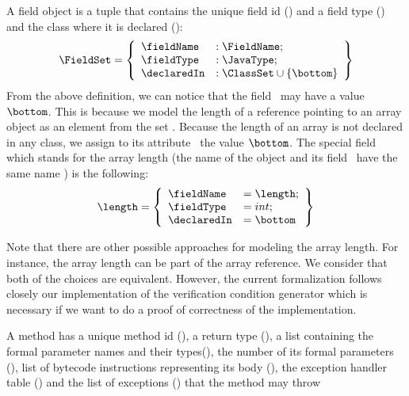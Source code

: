  A field object is a tuple that contains the unique field id (\fieldName) and a field type (\fieldType) and
 the class where it is declared (\declaredIn):  
 $$ \begin{array}{l}
         \FieldSet = \left\{\begin{array}{ll}   
		                               \fieldName  &  : \FieldName;\\
                                               \fieldType   &  : \JavaType; \\
					       \declaredIn  &  : \ClassSet \cup \{ \bottom \}
                     \end{array} \right\}
   \end{array} $$
  From the above definition, we can notice that the field \declaredIn \ may have a value $\bottom$. This is because we model 
  the length of a reference pointing to an array object as an element from the set \FieldSet. Because the length of 
  an array is not declared in any class, 
  we assign to its attribute \declaredIn \ the value $\bottom$.  
  The special field which stands for the array length  
 (the name of the object and its field  \fieldName \ have the same name ) is the following:
 $$  \length =  \left\{\begin{array}{ll} \fieldName & = \length;\\
			                 \fieldType  & = int; \\
					 \declaredIn & = \bottom
                     \end{array} \right\}$$

 Note that there are other possible approaches for modeling the array length. For instance,
 the array length can be part of the array reference. We consider that both of the choices are equivalent.
 However, the current formalization follows closely our implementation  of the verification condition 
 generator which is necessary if we want to do a proof of correctness of the implementation.


 A method has a unique method id (\methodName), a return type (\retType),
 a list containing the formal parameter names and their types(\args), 
 the number of its formal parameters (\numArgs),
 list of bytecode instructions representing its body (\body),
 the exception handler table (\excHandlerTable) and the list of exceptions
 (\exceptions) that the method may throw

